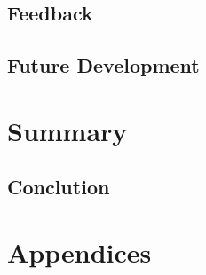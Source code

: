 \documentclass[BSP,english,oneside]{classes/gucthesis}
\begin{document}
	\section{Feedback}
		\label{sec:feedback}
		

	\section{Future Development}
		\label{sec:future_development}
		


\chapter{Summary}
	\label{chap:summary}

	\section{Conclution}
		\label{sec:conclution}
		



\chapter{Appendices}
 
\appendix %




\printnoidxglossary[sort=word]

\clearpage
{}
{}
\label{appx:time_management}





\end{document}
